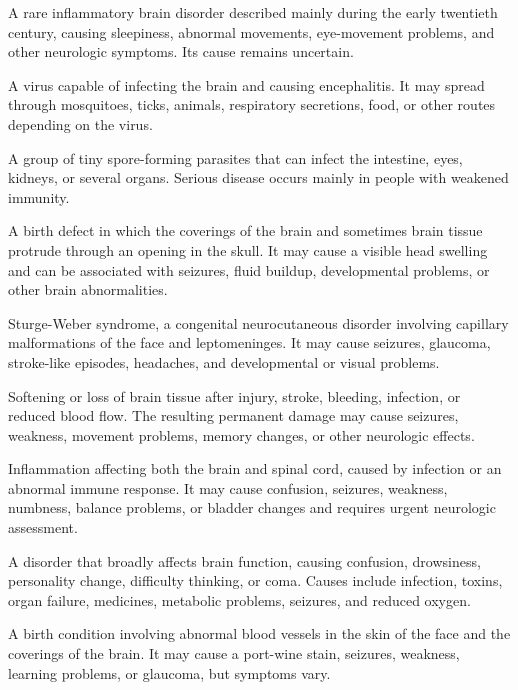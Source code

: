  A rare inflammatory brain disorder described mainly during the early twentieth century, causing sleepiness, abnormal movements, eye-movement problems, and other neurologic symptoms. Its cause remains uncertain.

 A virus capable of infecting the brain and causing encephalitis. It may spread through mosquitoes, ticks, animals, respiratory secretions, food, or other routes depending on the virus.

 A group of tiny spore-forming parasites that can infect the intestine, eyes, kidneys, or several organs. Serious disease occurs mainly in people with weakened immunity.

 A birth defect in which the coverings of the brain and sometimes brain tissue protrude through an opening in the skull. It may cause a visible head swelling and can be associated with seizures, fluid buildup, developmental problems, or other brain abnormalities.

 Sturge-Weber syndrome, a congenital neurocutaneous disorder involving capillary malformations of the face and leptomeninges. It may cause seizures, glaucoma, stroke-like episodes, headaches, and developmental or visual problems.

 Softening or loss of brain tissue after injury, stroke, bleeding, infection, or reduced blood flow. The resulting permanent damage may cause seizures, weakness, movement problems, memory changes, or other neurologic effects.

 Inflammation affecting both the brain and spinal cord, caused by infection or an abnormal immune response. It may cause confusion, seizures, weakness, numbness, balance problems, or bladder changes and requires urgent neurologic assessment.

 A disorder that broadly affects brain function, causing confusion, drowsiness, personality change, difficulty thinking, or coma. Causes include infection, toxins, organ failure, medicines, metabolic problems, seizures, and reduced oxygen.

 A birth condition involving abnormal blood vessels in the skin of the face and the coverings of the brain. It may cause a port-wine stain, seizures, weakness, learning problems, or glaucoma, but symptoms vary.

